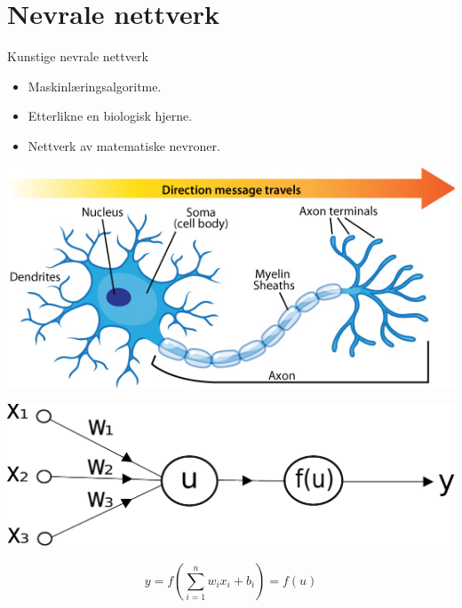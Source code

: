 \documentclass{beamer}
\begin{document}
\section{Nevrale nettverk}


\begin{frame}

\begin{block}{Kunstige nevrale nettverk}
 \begin{itemize}
  \item Maskinlæringsalgoritme.
  \item Etterlikne en biologisk hjerne.
  \item Nettverk av matematiske nevroner.
 \end{itemize}
\end{block}

\end{frame}


\begin{frame}
 
\centering
\includegraphics[width=0.8\linewidth]{../Figures/Theory/neuron_anatomy.jpg} 

\end{frame}


\begin{frame}

\centering
\includegraphics[width=0.8\linewidth]{../Figures/Theory/neuron.pdf} 

\begin{equation*}
 y = f\left(\sum_{i=1}^n w_ix_i + b_i\right) = f(u)
\end{equation*}
 
\end{frame}
\end{document}
